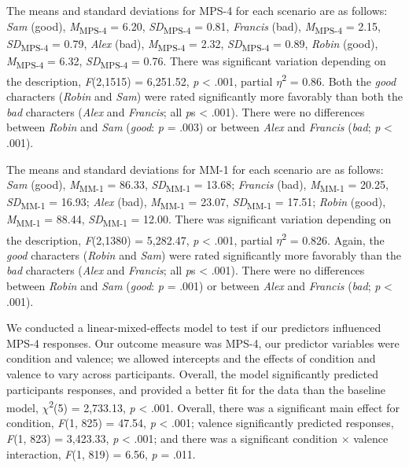 \documentclass[
  man,floatsintext]{apa7}
\begin{document}
The means and standard deviations for MPS-4 for each scenario are as follows:
\emph{Sam} (good),
\emph{M}\textsubscript{MPS-4} = 6.20, \emph{SD}\textsubscript{MPS-4} = 0.81,
\emph{Francis} (bad),
\emph{M}\textsubscript{MPS-4} = 2.15, \emph{SD}\textsubscript{MPS-4} = 0.79,
\emph{Alex} (bad),
\emph{M}\textsubscript{MPS-4} = 2.32, \emph{SD}\textsubscript{MPS-4} = 0.89,
\emph{Robin} (good),
\emph{M}\textsubscript{MPS-4} = 6.32, \emph{SD}\textsubscript{MPS-4} = 0.76. There was significant variation depending on the description, \emph{F}(2,1515) = 6,251.52, \emph{p} \textless{} .001, partial \(\eta\)\textsuperscript{2} = 0.86. Both the \emph{good} characters (\emph{Robin} and \emph{Sam}) were rated significantly more favorably than both the \emph{bad} characters (\emph{Alex} and \emph{Francis}; all \emph{p}s \textless{} .001). There were no differences between \emph{Robin} and \emph{Sam} (\emph{good}: \emph{p} = .003) or between \emph{Alex} and \emph{Francis} (\emph{bad}; \emph{p} \textless{} .001).

The means and standard deviations for MM-1 for each scenario are as follows:
\emph{Sam} (good),
\emph{M}\textsubscript{MM-1} = 86.33, \emph{SD}\textsubscript{MM-1} = 13.68;
\emph{Francis} (bad),
\emph{M}\textsubscript{MM-1} = 20.25, \emph{SD}\textsubscript{MM-1} = 16.93;
\emph{Alex} (bad),
\emph{M}\textsubscript{MM-1} = 23.07, \emph{SD}\textsubscript{MM-1} = 17.51;
\emph{Robin} (good),
\emph{M}\textsubscript{MM-1} = 88.44, \emph{SD}\textsubscript{MM-1} = 12.00. There was significant variation depending on the description, \emph{F}(2,1380) = 5,282.47, \emph{p} \textless{} .001, partial \(\eta\)\textsuperscript{2} = 0.826. Again, the \emph{good} characters (\emph{Robin} and \emph{Sam}) were rated significantly more favorably than the \emph{bad} characters (\emph{Alex} and \emph{Francis}; all \emph{p}s \textless{} .001). There were no differences between \emph{Robin} and \emph{Sam} (\emph{good}: \emph{p} = .001) or between \emph{Alex} and \emph{Francis} (\emph{bad}; \emph{p} \textless{} .001).

We conducted a linear-mixed-effects model to test if our predictors influenced MPS-4 responses. Our outcome measure was MPS-4, our predictor variables were condition and valence; we allowed intercepts and the effects of condition and valence to vary across participants.
Overall, the model significantly predicted participants responses, and provided a better fit for the data than the baseline model,
\(\chi\)\textsuperscript{2}(5) = 2,733.13, \emph{p} \textless{} .001.
Overall, there was a significant main effect for condition,
\emph{F}(1, 825) = 47.54, \emph{p} \textless{} .001;
valence significantly predicted responses,
\emph{F}(1, 823) = 3,423.33, \emph{p} \textless{} .001;
and there was a significant condition \(\times\) valence interaction,
\emph{F}(1, 819) = 6.56, \emph{p} = .011.
\end{document}
